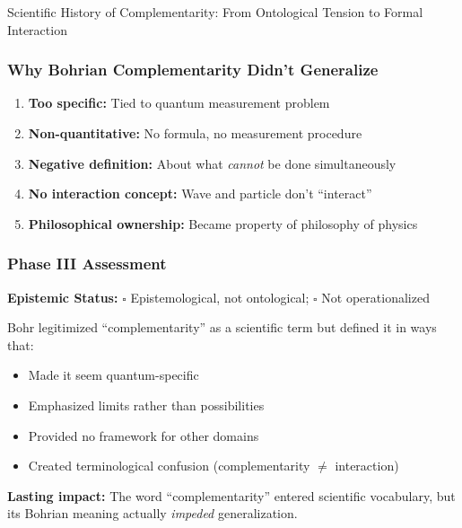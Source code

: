 \begin{chapter}{Scientific History of Complementarity: From Ontological Tension to Formal Interaction}
\subsubsection{Why Bohrian Complementarity Didn't Generalize}

\begin{enumerate}
    \item \textbf{Too specific:} Tied to quantum measurement problem
    \item \textbf{Non-quantitative:} No formula, no measurement procedure
    \item \textbf{Negative definition:} About what \textit{cannot} be done simultaneously
    \item \textbf{No interaction concept:} Wave and particle don't ``interact''
    \item \textbf{Philosophical ownership:} Became property of philosophy of physics
\end{enumerate}

\subsubsection{Phase III Assessment}

\begin{tcolorbox}[colback=yellow!5!white,colframe=yellow!75!black,title=\textbf{Phase III Verdict}]
\textbf{Epistemic Status:} $\square$ Epistemological, not ontological; $\square$ Not operationalized

Bohr legitimized ``complementarity'' as a scientific term but defined it in ways that:
\begin{itemize}[noitemsep]
    \item Made it seem quantum-specific
    \item Emphasized limits rather than possibilities
    \item Provided no framework for other domains
    \item Created terminological confusion (complementarity $\neq$ interaction)
\end{itemize}

\textbf{Lasting impact:} The word ``complementarity'' entered scientific vocabulary, but its Bohrian meaning actually \textit{impeded} generalization.
\end{tcolorbox}


\end{chapter}
